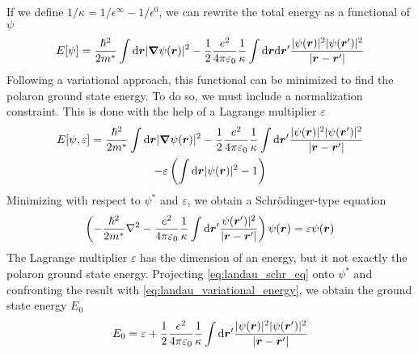 If we define $1/\kappa = 1/\epsilon^\infty - 1/\epsilon^0$, we can rewrite the total energy as a functional of $\psi$
\begin{equation}
    E[\psi] = \frac{\hslash^2}{2m^*} \int \differential\vec{r} |\grad \psi(\vec{r})|^2 - \oh \frac{e^2}{4\pi\varepsilon_0} \frac{1}{\kappa} \int \differential \vec{r} \differential \vec{r}' \frac{|\psi(\vec{r})|^2|\psi(\vec{r}')|^2}{|\vec{r}-\vec{r}'|}
\end{equation}
Following a variational approach, this functional can be minimized to find the polaron ground state energy. To do so, we must include a normalization constraint. This is done with the help of a Lagrange multiplier $\varepsilon$
\begin{multline} \label{eq:landau_variational_energy}
    E[\psi, \varepsilon] = \frac{\hslash^2}{2m^*} \int \differential\vec{r} |\grad \psi(\vec{r})|^2 - \oh \frac{e^2}{4\pi\varepsilon_0} \frac{1}{\kappa} \int \differential \vec{r}' \frac{|\psi(\vec{r})|^2|\psi(\vec{r}')|^2}{|\vec{r}-\vec{r}'|}
    \\ - \varepsilon \left( \int \differential\vec{r} |\psi(\vec{r})|^2 -1 \right)
\end{multline}
Minimizing with respect to $\psi^*$ and $\varepsilon$, we obtain a Schr\"{o}dinger-type equation
\begin{equation} \label{eq:landau_schr_eq}
    \left(-\frac{\hslash^2}{2m^*} \laplacian - \frac{e^2}{4\pi\varepsilon_0} \frac{1}{\kappa} \int \differential \vec{r}' \frac{\psi(\vec{r}')|^2}{|\vec{r}-\vec{r}'|} \right) \psi(\vec{r}) = \varepsilon \psi(\vec{r})
\end{equation}
The Lagrange multiplier $\varepsilon$ has the dimension of an energy, but it not exactly the polaron ground state energy. Projecting \cref{eq:landau_schr_eq} onto $\psi^*$ and confronting the result with \cref{eq:landau_variational_energy}, we obtain the ground state energy $E_0$
\begin{equation}
    E_0 = \varepsilon + \oh \frac{e^2}{4\pi\varepsilon_0} \frac{1}{\kappa} \int \differential \vec{r}' \frac{|\psi(\vec{r})|^2|\psi(\vec{r}')|^2}{|\vec{r}-\vec{r}'|}
\end{equation}


